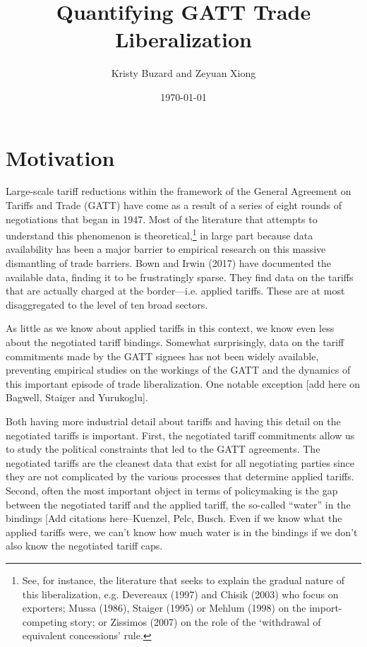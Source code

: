\documentclass[12pt]{article}
\begin{document}
\title{\vskip-0.6in Quantifying GATT Trade Liberalization}
\author{Kristy Buzard and Zeyuan Xiong}
\date{\today}
\maketitle

\section{Motivation}
Large-scale tariff reductions within the framework of the General Agreement on Tariffs and Trade (GATT) have come as a result of a series of eight rounds of negotiations that began in 1947. Most of the literature that attempts to understand this phenomenon is theoretical,\footnote{See, for instance, the literature that seeks to explain the gradual nature of this liberalization, e.g. Devereaux (1997) and  Chisik (2003) who focus on exporters; Mussa (1986), Staiger (1995) or Mehlum (1998) on the import-competing story; or Zissimos (2007) on the role of the `withdrawal of equivalent concessions' rule.} in large part because data availability has been a major barrier to empirical research on this massive dismantling of trade barriers. Bown and Irwin (2017) have documented the available data, finding it to be frustratingly sparse. They find data on the tariffs that are actually charged at the border---i.e. applied tariffs. These are at most disaggregated to the level of ten broad sectors. 

As little as we know about applied tariffs in this context, we know even less about the negotiated tariff bindings. Somewhat surprisingly, data on the tariff commitments made by the GATT signees has not been widely available, preventing empirical studies on the workings of the GATT and the dynamics of this important episode of trade liberalization. One notable exception {\color{red}[add here on Bagwell, Staiger and Yurukoglu]}.

Both having more industrial detail about tariffs and having this detail on the negotiated tariffs is important. First, the negotiated tariff commitments allow us to study the political constraints that led to the GATT agreements. The negotiated tariffs are the cleanest data that exist for all negotiating parties since they are not complicated by the various processes that determine applied tariffs. Second, often the most important object in terms of policymaking is the gap between the negotiated tariff and the applied tariff, the so-called “water” in the bindings {\color{red} [Add citations here--Kuenzel, Pelc, Busch}. Even if we know what the applied tariffs were, we can’t know how much water is in the bindings if we don’t also know the negotiated tariff caps.
\end{document}
